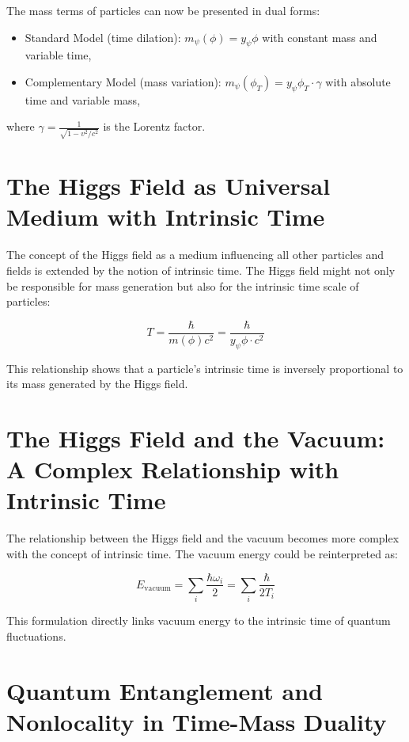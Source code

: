 \documentclass{article}
\begin{document}
	The mass terms of particles can now be presented in dual forms:
	
	\begin{itemize}
		\item Standard Model (time dilation): $m_\psi(\phi) = y_\psi \phi$ with constant mass and variable time,
		\item Complementary Model (mass variation): $m_\psi(\phi_T) = y_\psi \phi_T \cdot \gamma$ with absolute time and variable mass,
	\end{itemize}
	
	where $\gamma = \frac{1}{\sqrt{1-v^2/c^2}}$ is the Lorentz factor.
	
	\section{The Higgs Field as Universal Medium with Intrinsic Time}
	
	The concept of the Higgs field as a medium influencing all other particles and fields is extended by the notion of intrinsic time. The Higgs field might not only be responsible for mass generation but also for the intrinsic time scale of particles:
	
	\begin{equation}
		T = \frac{\hbar}{m(\phi)c^2} = \frac{\hbar}{y_\psi \phi \cdot c^2}
	\end{equation}
	
	This relationship shows that a particle's intrinsic time is inversely proportional to its mass generated by the Higgs field.
	
	\section{The Higgs Field and the Vacuum: A Complex Relationship with Intrinsic Time}
	
	The relationship between the Higgs field and the vacuum becomes more complex with the concept of intrinsic time. The vacuum energy could be reinterpreted as:
	
	\begin{equation}
		E_\text{vacuum} = \sum_i \frac{\hbar \omega_i}{2} = \sum_i \frac{\hbar}{2T_i}
	\end{equation}
	
	This formulation directly links vacuum energy to the intrinsic time of quantum fluctuations.
	
	\section{Quantum Entanglement and Nonlocality in Time-Mass Duality}
	
\end{document}
